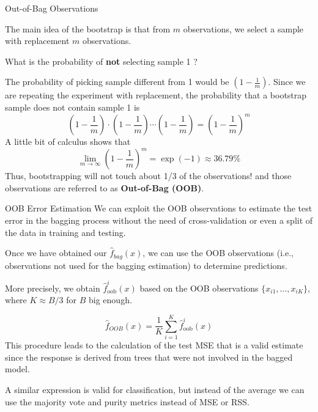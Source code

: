 \documentclass{beamer}
\begin{document}
	\begin{frame}{Out-of-Bag Observations}
		
		The main idea of the bootstrap is that from $m$ observations, we select a sample with replacement $m$ observations.
		
		What is the probability of {\bf not} selecting sample 1 ?
		
		The probability of picking sample different from 1 would be 
		$(1 - \frac{1}{m})$. Since we are repeating the experiment with replacement, the probability that a bootstrap sample does not contain sample 1 is 
		\begin{equation*}
			\left(1 - \frac{1}{m}\right) \cdot \left(1 - \frac{1}{m}\right) \cdots \left(1 - \frac{1}{m}\right) = \left(1 - \frac{1}{m}\right)^m
		\end{equation*}
		A little bit of calculus shows that 
		\begin{equation*}
			\lim_{m\to\infty}\left(1-\frac{1}{m}\right)^m= \exp(-1) \approx 36.79\%
		\end{equation*}
		Thus, bootstrapping will not touch about 1/3 of the observations!
		and those observations are referred to as {\bf Out-of-Bag (OOB)}.  
	\end{frame}
	
	\begin{frame}{OOB Error Estimation}
		We can exploit the OOB observations to estimate the test error in the bagging process without the need of cross-validation or even a split of the data in training and testing.
		
		Once we have obtained our $\hat{f}_{bag}(x)$, we can use the OOB observations (i.e., observations not used for the bagging estimation) to determine predictions. 
		
		More precisely, we obtain $\hat{f}_{\textrm{oob}}^i (x)$ based on the OOB observations $\{x_{i1},\ldots, x_{iK}\}$, where $K \approx B/3$ for $B$ big enough. 
		
		
		
		
		\begin{equation*}
			\hat{f}_{OOB}(x)= \frac{1}{K}\sum_{i=1}^{K} \hat{f}^{i}_{\textrm{oob}}(x)
		\end{equation*}
		This procedure leads to the calculation of the test MSE that is a valid estimate since the response is derived from trees that were not involved in the bagged model.
		
		A similar expression is valid for classification, but instead of the average we can use the majority vote and purity metrics instead of MSE or RSS. 
	\end{frame}
	
\end{document}

